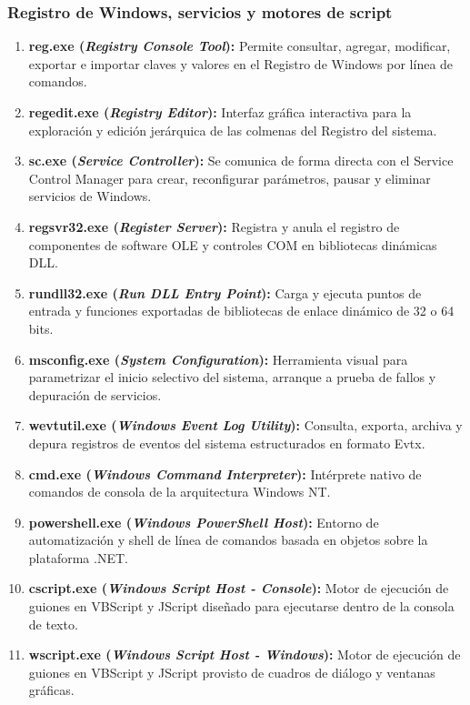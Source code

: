 \documentclass[12pt]{article}
\begin{document}
\subsubsection{Registro de Windows, servicios y motores de script}
\begin{enumerate}[leftmargin=*, noitemsep, topsep=1pt]
    \item \textbf{reg.exe (\textit{Registry Console Tool}):} Permite consultar, agregar, modificar, exportar e importar claves y valores en el Registro de Windows por línea de comandos.
    \item \textbf{regedit.exe (\textit{Registry Editor}):} Interfaz gráfica interactiva para la exploración y edición jerárquica de las colmenas del Registro del sistema.
    \item \textbf{sc.exe (\textit{Service Controller}):} Se comunica de forma directa con el Service Control Manager para crear, reconfigurar parámetros, pausar y eliminar servicios de Windows.
    \item \textbf{regsvr32.exe (\textit{Register Server}):} Registra y anula el registro de componentes de software OLE y controles COM en bibliotecas dinámicas DLL.
    \item \textbf{rundll32.exe (\textit{Run DLL Entry Point}):} Carga y ejecuta puntos de entrada y funciones exportadas de bibliotecas de enlace dinámico de 32 o 64 bits.
    \item \textbf{msconfig.exe (\textit{System Configuration}):} Herramienta visual para parametrizar el inicio selectivo del sistema, arranque a prueba de fallos y depuración de servicios.
    \item \textbf{wevtutil.exe (\textit{Windows Event Log Utility}):} Consulta, exporta, archiva y depura registros de eventos del sistema estructurados en formato Evtx.
    \item \textbf{cmd.exe (\textit{Windows Command Interpreter}):} Intérprete nativo de comandos de consola de la arquitectura Windows NT.
    \item \textbf{powershell.exe (\textit{Windows PowerShell Host}):} Entorno de automatización y shell de línea de comandos basada en objetos sobre la plataforma .NET.
    \item \textbf{cscript.exe (\textit{Windows Script Host - Console}):} Motor de ejecución de guiones en VBScript y JScript diseñado para ejecutarse dentro de la consola de texto.
    \item \textbf{wscript.exe (\textit{Windows Script Host - Windows}):} Motor de ejecución de guiones en VBScript y JScript provisto de cuadros de diálogo y ventanas gráficas.
\end{enumerate}
\end{document}
